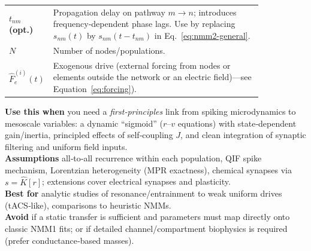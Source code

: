 \documentclass[11pt]{article}
\numberwithin{equation}{section}
\begin{document}
\begin{tcolorbox}
\begin{tabular}{@{}l p{0.84\linewidth}@{}}
\textbf{$t_{nm}$ (opt.)} & Propagation delay on pathway $m{\to}n$; introduces frequency‑dependent phase lags. Use by replacing $s_{nm}(t)$ by $s_{nm}(t-t_{nm})$ in Eq.~\ref{eq:nmm2-general}.\\
\textbf{$N$} & Number of nodes/populations.\\
\textbf{$\hat F_{e}^{(i)}(t)$}& Exogenous drive  (external forcing from nodes or elements outside the network or an electric field)---see Equation~\ref{eq:forcing}).\\
\end{tabular}
\end{tcolorbox}

\begin{tcolorbox}[
  colback=gray!5,
  colframe=slate,
  colbacktitle=softblue!25,
  coltitle=softblue!60!black,
  fonttitle=\bfseries\small,
  title={\small When to Use It — Next‑Generation Neural Mass (NMM2)},
  boxrule=0.4pt, enhanced, sharp corners,
  left=4pt,right=4pt,top=3pt,bottom=3pt,
  boxsep=2pt, before skip=6pt, after skip=6pt
]
\scriptsize
\textbf{Use this when} you need a \emph{first‑principles} link from spiking microdynamics to mesoscale variables: a dynamic “sigmoid” ($r$–$v$ equations) with state‑dependent gain/inertia, principled effects of self‑coupling $J$, and clean integration of synaptic filtering and uniform field inputs.\\
\textbf{Assumptions} all‑to‑all recurrence within each population, QIF spike mechanism, Lorentzian heterogeneity (MPR exactness), chemical synapses via $s=\hat K[r]$; extensions cover electrical synapses and plasticity.\\
\textbf{Best for} analytic studies of resonance/entrainment to weak uniform drives (tACS‑like), comparisons to heuristic NMMs.\\
\textbf{Avoid} if a static transfer is sufficient and parameters must map directly onto classic NMM1 fits; or if detailed channel/compartment biophysics is required (prefer conductance‑based masses).
\end{tcolorbox}
\end{document}
